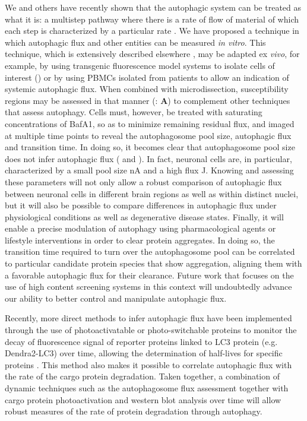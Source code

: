 We and others have recently shown that the autophagic system can be treated as what it is: a multistep pathway where there is a rate of flow of material of which each step is characterized by a particular rate \citep{Meijer2009,loos2014}. We have proposed a technique in which autophagic flux and other entities can be measured \textit{in vitro}. This technique, which is extensively described elsewhere \citep{loos2014,DuToit2018b}, may be adapted ex \textit{vivo}, for example, by using transgenic fluorescence model systems \citep{Mizushima2004a} to isolate cells of interest () or by using PBMCs isolated from patients \citep{Rangwala2014} to allow an indication of systemic autophagic flux. When combined with microdissection, susceptibility regions may be assessed in that manner (: \textbf{A}) to complement other techniques that assess autophagy. Cells must, however, be treated with saturating concentrations of BafA1, so as to minimize remaining residual flux, and imaged at multiple time points to reveal the autophagosome pool size, autophagic flux and transition time. In doing so, it becomes clear that autophagosome pool size does not infer autophagic flux ( and ). In fact, neuronal cells are, in particular, characterized by a small pool size nA and a high flux J. Knowing and assessing these parameters will not only allow a robust comparison of autophagic flux between neuronal cells in different brain regions as well as within distinct nuclei, but it will also be possible to compare differences in autophagic flux under physiological conditions as well as degenerative disease states. Finally, it will enable a precise modulation of autophagy using pharmacological agents or lifestyle interventions in order to clear protein aggregates. In doing so, the transition time required to turn over the autophagosome pool can be correlated to particular candidate protein species that show aggregation, aligning them with a favorable autophagic flux for their clearance. Future work that focuses on the use of high content screening systems in this context will undoubtedly advance our ability to better control and manipulate autophagic flux. 

Recently, more direct methods to infer autophagic flux have been implemented through the use of photoactivatable or photo-switchable proteins to monitor the decay of fluorescence signal of reporter proteins linked to LC3 protein (e.g. Dendra2-LC3) over time, allowing the determination of half-lives for specific proteins \citep{Tsvetkov2013}. This method also makes it possible to correlate autophagic flux with the rate of the cargo protein degradation. Taken together, a combination of dynamic techniques such as the autophagosome flux assessment together with cargo protein photoactivation and western blot analysis over time will allow robust measures of the rate of protein degradation through autophagy.

